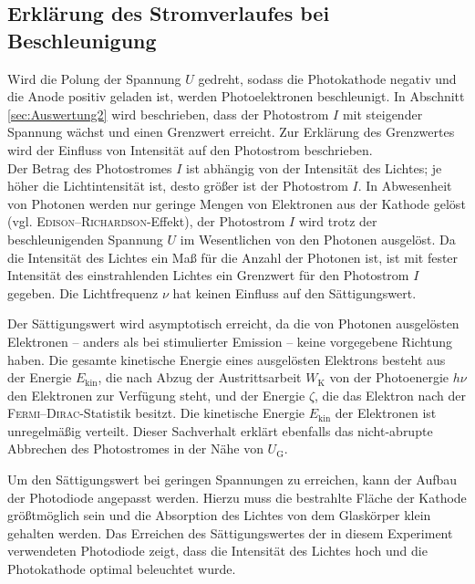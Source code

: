 \subsection{Erklärung des Stromverlaufes bei Beschleunigung} %
\label{sub:Diskussion4}
Wird die Polung der Spannung $U$ gedreht, sodass die Photokathode negativ und die Anode positiv geladen ist, 
werden Photoelektronen beschleunigt.
In Abschnitt \ref{sec:Auswertung2} wird beschrieben, dass der Photostrom $I$ mit steigender Spannung wächst und einen Grenzwert erreicht.
Zur Erklärung des Grenzwertes wird der Einfluss von Intensität auf den Photostrom beschrieben.\\
Der Betrag des Photostromes $I$ ist abhängig von der Intensität des Lichtes; je höher die Lichtintensität ist, desto größer ist der Photostrom $I$.
In Abwesenheit von Photonen werden nur geringe Mengen von Elektronen aus der Kathode gelöst (vgl. \textsc{Edison}--\textsc{Richardson}-Effekt), der Photostrom $I$ wird trotz der beschleunigenden Spannung $U$ im Wesentlichen von den Photonen ausgelöst.
Da die Intensität des Lichtes ein Maß für die Anzahl der Photonen ist, ist mit fester Intensität des einstrahlenden Lichtes ein Grenzwert für den Photostrom $I$ gegeben.
Die Lichtfrequenz $\nu$ hat keinen Einfluss auf den Sättigungswert.

Der Sättigungswert wird asymptotisch erreicht, da die von Photonen ausgelösten Elektronen -- anders als bei stimulierter Emission -- keine vorgegebene Richtung haben.
Die gesamte kinetische Energie eines ausgelösten Elektrons besteht aus der Energie $E_\text{kin}$, die nach Abzug der Austrittsarbeit $W_\text{K}$ von der Photoenergie $h\nu$ den Elektronen zur Verfügung steht, 
und der Energie $\zeta$, die das Elektron nach der \textsc{Fermi}--\textsc{Dirac}-Statistik besitzt.
Die kinetische Energie $E_\text{kin}$ der Elektronen ist unregelmäßig verteilt.
Dieser Sachverhalt erklärt ebenfalls das nicht-abrupte Abbrechen des Photostromes in der Nähe von $U_\text{G}$.

Um den Sättigungswert bei geringen Spannungen zu erreichen, kann der Aufbau der Photodiode angepasst werden.
Hierzu muss die bestrahlte Fläche der Kathode größtmöglich sein und 
die Absorption des Lichtes von dem Glaskörper klein gehalten werden.
Das Erreichen des Sättigungswertes der in diesem Experiment verwendeten Photodiode zeigt, dass die Intensität des Lichtes hoch und die Photokathode optimal beleuchtet wurde.

